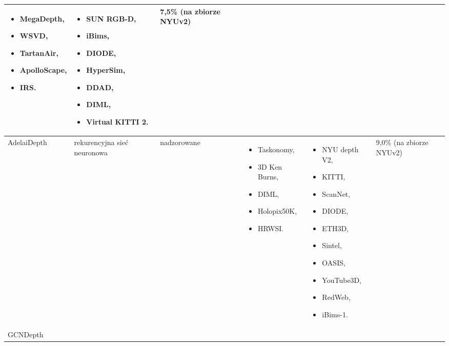 \begin{table}[H]
{\begin{tabular}{ |l|p{2cm}|p{3cm}|p{5cm}|p{5cm}|p{2cm}| }
\begin{itemize}
            \item MegaDepth,
            \item WSVD,
            \item TartanAir,
            \item ApolloScape,
            \item IRS.
        \end{itemize} & 
        \begin{itemize} 
            \item SUN RGB-D,
            \item iBims,
            \item DIODE,
            \item HyperSim,
            \item DDAD,
            \item DIML,
            \item Virtual KITTI 2.
        \end{itemize} &
        7,5\% (na zbiorze NYUv2)\\
        \hline
        AdelaiDepth \cite{dosovitskiy2020} &
        rekurencyjna sieć neuronowa &
        nadzorowane &
        \begin{itemize} 
            \item Taskonomy,
            \item 3D Ken Burns, 
            \item DIML, 
            \item Holopix50K, 
            \item HRWSI. 
        \end{itemize} &
        \begin{itemize} 
            \item NYU depth V2,
            \item KITTI,
            \item ScanNet,
            \item DIODE,
            \item ETH3D,
            \item Sintel,
            \item OASIS,
            \item YouTube3D,
            \item RedWeb,
            \item iBims-1. 
        \end{itemize} &
        9,0\% (na zbiorze NYUv2)\\
        \hline
        GCNDepth \cite{masoumian2021gcndepth} &

\end{tabular}}
\end{table}
